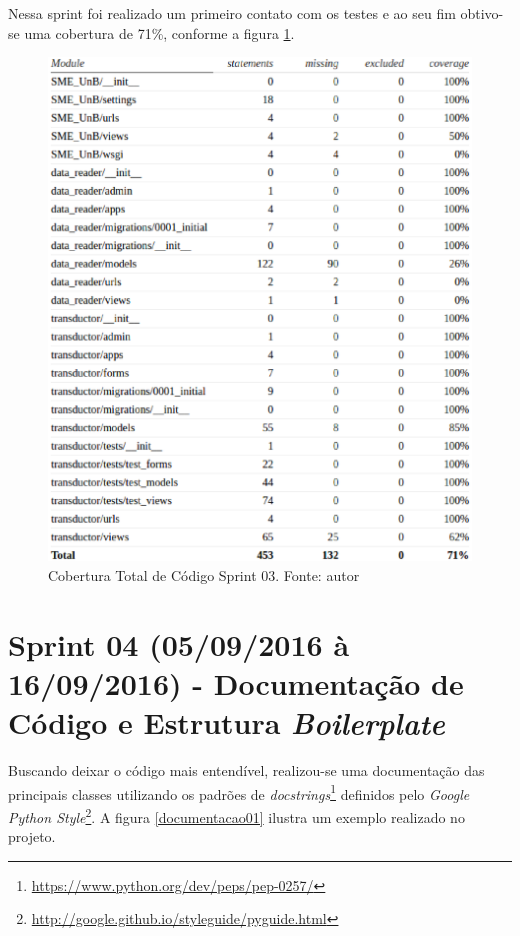 \vfill
\pagebreak

Nessa sprint foi realizado um primeiro contato com os testes e ao seu fim obtivo-se uma cobertura de 71\%, conforme a figura \ref{cobertura01}.

\begin{figure}[!htpb]
    \centering
    \includegraphics[keepaspectratio=true,scale=0.5]{figuras/cobertura01.eps}
    \caption{Cobertura Total de Código Sprint 03. Fonte: autor}
    \label{cobertura01}
\end{figure}

\section{Sprint 04 (05/09/2016 à 16/09/2016) - Documentação de Código e Estrutura \textit{Boilerplate}}
Buscando deixar o código mais entendível, realizou-se uma documentação das principais classes utilizando os padrões de \textit{docstrings}\footnote{\url{https://www.python.org/dev/peps/pep-0257/}} definidos pelo \textit{Google Python Style}\footnote{\url{http://google.github.io/styleguide/pyguide.html}}. A figura \ref{documentacao01} ilustra um exemplo realizado no projeto.

